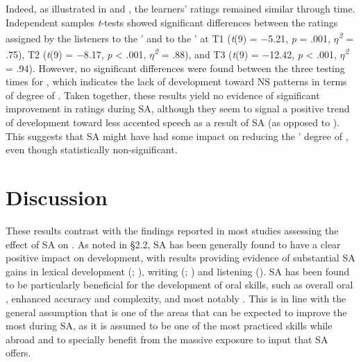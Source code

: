 \documentclass[output=paper]{langsci/langscibook}
\begin{document}
Indeed, as illustrated in  and , the  learners’  ratings remained similar through time. Independent samples \textit{t}{}-tests showed significant differences between the ratings assigned by the listeners to the ’ and to the ’ at T1 (\textit{t}(9) = $-$5.21, \textit{p}  = .001, \textit{$\eta $\textsuperscript{2} }=  .75), T2 (\textit{t}(9) = $-$8.17, \textit{p} < .001, \textit{$\eta $\textsuperscript{2} }= .88), and T3 (\textit{t}(9) = $-$12.42, \textit{p} < .001, \textit{$\eta $\textsuperscript{2} }= .94). However, no significant differences were found between the three testing times for , which indicates the lack of development toward NS patterns in terms of degree of . Taken together, these results yield no evidence of significant improvement in  ratings during SA, although they seem to signal a positive trend of development toward less accented speech as a result of SA (as opposed to ). This suggests that SA might have had some impact on reducing the ’ degree of , even though statistically non-significant.


\section{Discussion}

These results contrast with the findings reported in most studies assessing the effect of SA on  . As noted in §2.2, SA has been generally found to have a clear positive impact on   development, with results providing evidence of substantial SA gains in lexical development (\citealt{Collentine2004}; \citeauthor{LlanesMuñoz2009}), writing (\citealt{Sasaki2004}; \citealt{Pérez-VidalJuan-Garau2011}) and listening (\citealt{AllenHerron2003,LlanesMuñoz2009}). SA has been found to be particularly beneficial for the development of 
oral skills, such as overall oral , enhanced accuracy and complexity, and most notably  \citep{BrechtEtAl1995,SegalowitzFreed2004,FreedEtAl2004,Valls-Ferrer2011}. This is in line with the general assumption that  is one of the areas that can be expected to improve the most during SA, as it is assumed to be one of the most practiced skills while abroad and to specially benefit from the massive exposure to  input that SA offers.
\end{document}
